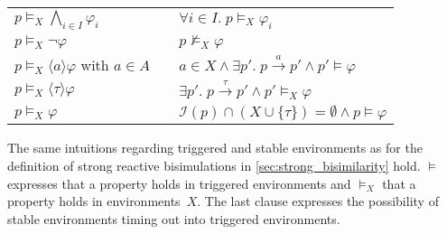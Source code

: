 \begin{isabellebody}
\begin{isamarkuptext}
\begin{tabular}{l l l}
    
    $p \vDash_X \bigwedge_{i \in I} \varphi_i$ 
    & \text{if} 
    & $\forall i \in I.\; p \vDash_X \varphi_i$ \\
    
    $p \vDash_X \neg\varphi$
    & \text{if} 
    & $p \not\vDash_X \varphi$ \\
    
    $p \vDash_X \langle a \rangle \varphi$ \quad with $a \in A$
    & \text{if} 
    & $a \in X \wedge \exists p'.\; p \xrightarrow{a} p' \wedge p' \vDash \varphi$ \\
    
    $p \vDash_X \langle \tau \rangle \varphi$
    & \text{if} 
    & $\exists p'.\; p \xrightarrow{\tau} p' \wedge p' \vDash_X \varphi$ \\[0.5em]
    
    
    $p \vDash_X \varphi$
    & \text{if} 
    & $\mathcal{I}(p) \cap (X \cup \{\tau\}) = \emptyset \wedge p \vDash \varphi$
\end{tabular}%
\end{isamarkuptext}\isamarkuptrue%
%
\begin{isamarkuptext}%
The same intuitions regarding triggered and stable environments as for the definition of strong reactive bisimulations in \cref{sec:strong_bisimilarity} hold. $\vDash$ expresses that a property holds in triggered environments and $\vDash_X$ that a property holds in environments~$X$. The last clause expresses the possibility of stable environments timing out into triggered environments.


\end{isamarkuptext}
\end{isabellebody}
